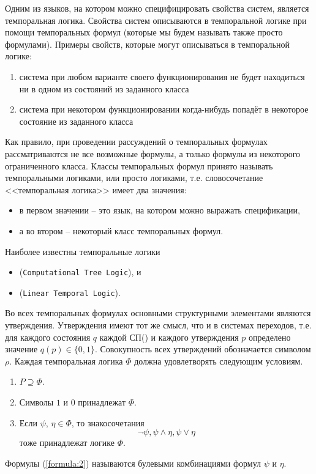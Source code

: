 \documentclass[12pt, twoside]{report}
\begin{document}
Одним из языков, на котором можно специфицировать свойства
систем, является темпоральная логика\cite{Mironov:ModelChecking}.
Свойства систем описываются в темпоральной логике при помощи темпоральных формул 
(которые мы будем называть также просто формулами). Примеры свойств, которые могут 
описываться в темпоральной логике:
\begin{enumerate}
  \item система при любом варианте своего функционирования не будет находиться ни в одном из состояний из заданного класса
  \item система при некотором функционировании когда-нибудь попадёт в некоторое состояние из заданного класса
\end{enumerate}
Как правило, при проведении рассуждений о темпоральных формулах рассматриваются не все возможные 
формулы, а только формулы из некоторого ограниченного класса. Классы темпоральных формул принято 
называть темпоральными логиками, или просто логиками, т.е. словосочетание <<темпоральная логика>> имеет два значения:
\begin{itemize}
  \item в первом значении – это язык, на котором можно выражать спецификации,
  \item а во втором – некоторый класс темпоральных формул.
\end{itemize}
Наиболее известны темпоральные логики
\begin{itemize}
  \item {} (\texttt{Computational Tree Logic}), и
  \item {} (\texttt{Linear Temporal Logic}).
\end{itemize}
Во всех темпоральных формулах основными структурными элементами являются утверждения. 
Утверждения имеют тот же смысл, что и в системах переходов, т.е. для каждого состояния 
$q$ каждой СП() и каждого утверждения $p$ определено значение $q(p) \in \{0, 1\}$. 
Совокупность всех утверждений обозначается символом $\rho$. Каждая темпоральная логика $\Phi$ 
должна удовлетворять следующим условиям.
\begin{enumerate}
  \item $P \supseteq \Phi$.
  \item Символы $1$ и $0$ принадлежат $\Phi$.
  \item Если $\psi$, $\eta \in \Phi$, то знакосочетания 
    \begin{equation}\label{formula:2}
      \neg\psi, \psi \wedge \eta, \psi \vee \eta
    \end{equation}
    тоже принадлежат логике $\Phi$.
\end{enumerate}
Формулы (\ref{formula:2}) называются булевыми комбинациями формул $\psi$ и $\eta$.
\end{document}
